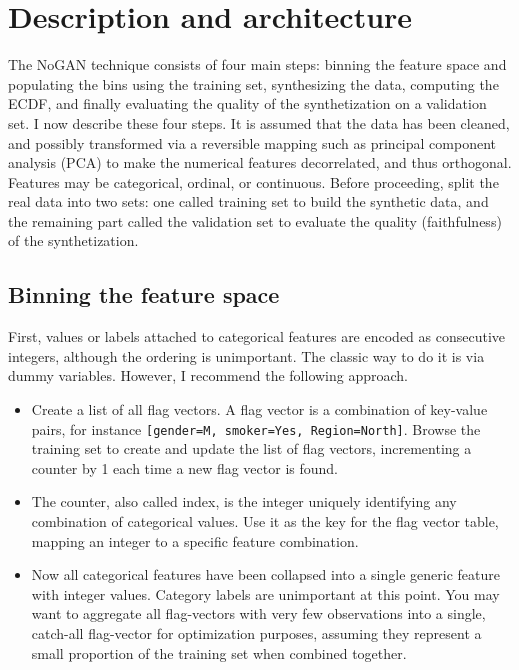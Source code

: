 \documentclass[oneside,10pt]{book}
\begin{document}
\section{Description and architecture}\label{daberikh}

The NoGAN technique consists of four main steps: binning the feature space and populating the bins using the training set, synthesizing the data, computing the ECDF,  
 and finally evaluating the quality of the synthetization on a validation set.  I now describe these four steps. It is assumed that the data has been cleaned, and possibly transformed via a reversible mapping such as \textcolor{index}{principal component analysis} (PCA) to make the numerical features decorrelated, and thus orthogonal. Features may be categorical, ordinal, or continuous. Before proceeding, split the real data into two sets: one called \textcolor{index}{training set} to build the synthetic data, and the remaining part called the \textcolor{index}{validation set} to evaluate the quality (faithfulness) of the synthetization. 

\subsection{Binning the feature space}

First, values or labels attached to categorical features are encoded as consecutive integers, although the ordering is unimportant. The classic way to do it is
 via \textcolor{index}{dummy variables}. However, I recommend the following approach. %

\begin{itemize}
\item Create a list of all flag vectors. A flag vector is a combination of \textcolor{index}{key-value pairs},
 for instance \texttt{[gender=M, smoker=Yes, Region=North]}. Browse the training set to create and update the list of flag vectors, incrementing a counter by 1 each time a new flag vector is found. 
\item The counter, also called index, is the integer uniquely identifying any combination of categorical values. Use it as the key for the flag vector table, mapping an integer to a specific feature combination.
\item Now all categorical features have been collapsed into a single generic feature with integer values. Category labels are unimportant at this point. You may want to aggregate all flag-vectors with very few observations into a single, catch-all flag-vector for optimization purposes, assuming they represent a small proportion of the training set
 when combined together.
\end{itemize}\vspace{1ex}
\end{document}
